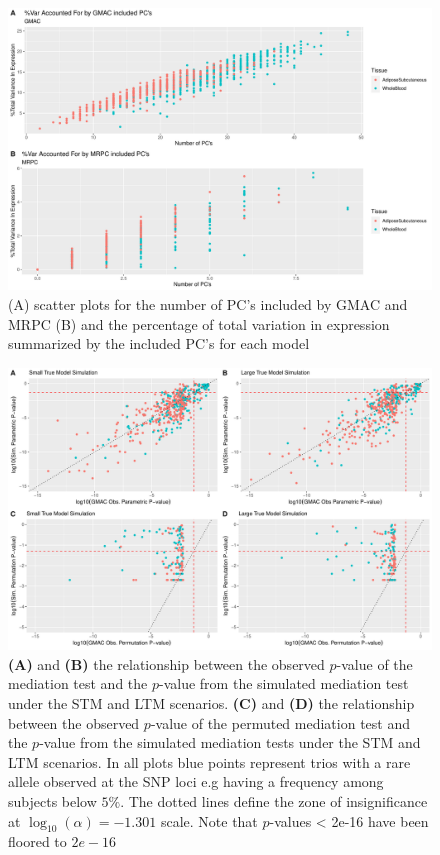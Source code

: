 \documentclass[
]{article}
\begin{document}
\begin{figure}
\centering
\includegraphics{GMACwriteup_files/figure-latex/unnamed-chunk-5-1.pdf}
\caption{(A) scatter plots for the number of PC's included by GMAC and
MRPC (B) and the percentage of total variation in expression summarized
by the included PC's for each model}
\end{figure}

\begin{figure}
\centering
\includegraphics{GMACwriteup_files/figure-latex/unnamed-chunk-6-1.pdf}
\caption{\textbf{(A)} and \textbf{(B)} the relationship between the
observed \(p\)-value of the mediation test and the \(p\)-value from the
simulated mediation test under the STM and LTM scenarios. \textbf{(C)}
and \textbf{(D)} the relationship between the observed \(p\)-value of
the permuted mediation test and the \(p\)-value from the simulated
mediation tests under the STM and LTM scenarios. In all plots blue
points represent trios with a rare allele observed at the SNP loci e.g
having a frequency among subjects below \(5\%\). The dotted lines define
the zone of insignificance at \(\log_{10}(\alpha) = -1.301\) scale. Note
that \(p\)-values \textless{} 2e-16 have been floored to \(2e-16\)}
\end{figure}
\end{document}
